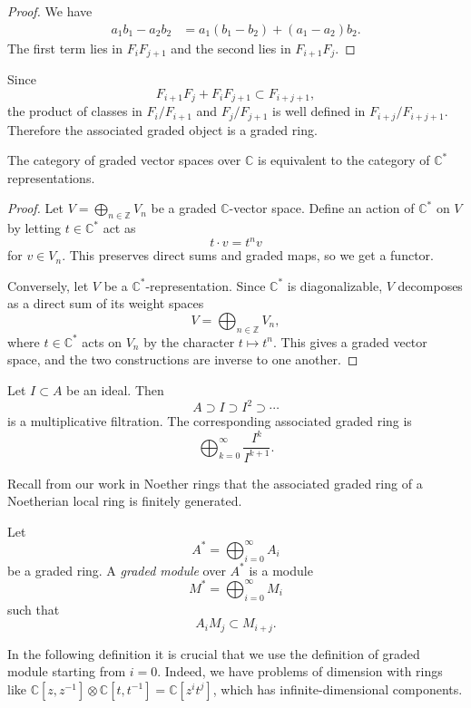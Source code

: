 \begin{proof}
We have
$$
\begin{aligned}
a_1b_1-a_2b_2
&=a_1(b_1-b_2)+(a_1-a_2)b_2.
\end{aligned}
$$
The first term lies in $F_iF_{j+1}$ and the
second lies in $F_{i+1}F_j$.
\end{proof}

\begin{remark}
\label{remark-associated-graded-ring}
Since
$$
F_{i+1}F_j+F_iF_{j+1}\subset F_{i+j+1},
$$
the product of classes in
$F_i/F_{i+1}$ and $F_j/F_{j+1}$ is well
defined in $F_{i+j}/F_{i+j+1}$.
Therefore the associated graded object is a
graded ring.
\end{remark}

\begin{lemma}
\label{lemma-graded-vs-cstar}
The category of graded vector spaces over
$\mathbb{C}$ is equivalent to the category of
$\mathbb{C}^*$ representations.
\end{lemma}

\begin{proof}
Let $V=\bigoplus_{n\in \mathbb{Z}}V_n$ be a
graded $\mathbb{C}$-vector space.
Define an action of $\mathbb{C}^*$ on $V$
by letting $t\in \mathbb{C}^*$ act as
$$
t\cdot v=t^n v
$$
for $v\in V_n$.
This preserves direct sums and graded maps,
so we get a functor.

Conversely, let $V$ be a
$\mathbb{C}^*$-representation.
Since $\mathbb{C}^*$ is diagonalizable, $V$
decomposes as a direct sum of its weight
spaces
$$
V=\bigoplus_{n\in \mathbb{Z}}V_n,
$$
where $t\in \mathbb{C}^*$ acts on $V_n$ by
the character $t\mapsto t^n$.
This gives a graded vector space, and the two
constructions are inverse to one another.
\end{proof}

\begin{definition}
\label{definition-ideal-filtration}
Let $I\subset A$ be an ideal.
Then
$$
A\supset I\supset I^2\supset \cdots
$$
is a multiplicative filtration.
The corresponding associated graded ring is
$$
\bigoplus_{k=0}^{\infty} \frac{I^k}{I^{k+1}}.
$$
\end{definition}

\noindent
Recall from our work in Noether rings
that the associated graded ring
of a Noetherian local ring is finitely
generated.

\begin{definition}
\label{definition-graded-module}
Let
$$
A^\ast=\bigoplus_{i=0}^{\infty} A_i
$$
be a graded ring.
A {\it graded module} over $A^\ast$ is a
module
$$
M^\ast=\bigoplus_{i=0}^{\infty} M_i
$$
such that
$$
A_iM_j\subset M_{i+j}.
$$
\end{definition}
\noindent
In the following definition
it is crucial that we use the definition
of graded module starting from $i=0$.
Indeed, we have problems of dimension
with rings like
$\mathbb{C}[z,z^{-1}] \otimes
\mathbb{C}[t,t^{-1}]
=\mathbb{C}[z^i t^j]$,
which has infinite-dimensional components.

